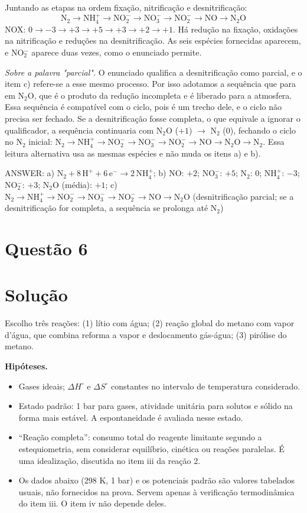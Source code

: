 \documentclass{article}%
\begin{document}
Juntando as etapas na ordem fixação, nitrificação e desnitrificação:
\[
\mathrm{N_2 \rightarrow NH_4^{+} \rightarrow NO_2^{-} \rightarrow NO_3^{-} \rightarrow NO_2^{-} \rightarrow NO \rightarrow N_2O}
\]
NOX: $0 \rightarrow -3 \rightarrow +3 \rightarrow +5 \rightarrow +3 \rightarrow +2 \rightarrow +1$. Há redução na fixação, oxidações na nitrificação e reduções na desnitrificação. As seis espécies fornecidas aparecem, e NO$_2^-$ aparece duas vezes, como o enunciado permite.

\emph{Sobre a palavra "parcial".} O enunciado qualifica a desnitrificação como parcial, e o item c) refere-se a esse mesmo processo. Por isso adotamos a sequência que para em N$_2$O, que é o produto da redução incompleta e é liberado para a atmosfera. Essa sequência é compatível com o ciclo, pois é um trecho dele, e o ciclo não precisa ser fechado. Se a desnitrificação fosse completa, o que equivale a ignorar o qualificador, a sequência continuaria com N$_2$O ($+1$) $\rightarrow$ N$_2$ ($0$), fechando o ciclo no N$_2$ inicial: $\mathrm{N_2 \rightarrow NH_4^{+} \rightarrow NO_2^{-} \rightarrow NO_3^{-} \rightarrow NO_2^{-} \rightarrow NO \rightarrow N_2O \rightarrow N_2}$. Essa leitura alternativa usa as mesmas espécies e não muda os itens a) e b).

ANSWER: a) $\mathrm{N_2 + 8\,H^{+} + 6\,e^{-} \longrightarrow 2\,NH_4^{+}}$; b) NO: $+2$; NO$_3^-$: $+5$; N$_2$: $0$; NH$_4^+$: $-3$; NO$_2^-$: $+3$; N$_2$O (média): $+1$; c) $\mathrm{N_2 \rightarrow NH_4^{+} \rightarrow NO_2^{-} \rightarrow NO_3^{-} \rightarrow NO_2^{-} \rightarrow NO \rightarrow N_2O}$ (desnitrificação parcial; se a desnitrificação for completa, a sequência se prolonga até N$_2$)%
\newpage%
\section*{Questão 6}

\section*{Solução}

Escolho três reações: (1) lítio com água; (2) reação global do metano com vapor d'água, que combina reforma a vapor e deslocamento gás-água; (3) pirólise do metano.

\textbf{Hipóteses.}
\begin{itemize}
\item Gases ideais; $\Delta H^\circ$ e $\Delta S^\circ$ constantes no intervalo de temperatura considerado.
\item Estado padrão: 1 bar para gases, atividade unitária para solutos e sólido na forma mais estável. A espontaneidade é avaliada nesse estado.
\item ``Reação completa'': consumo total do reagente limitante segundo a estequiometria, sem considerar equilíbrio, cinética ou reações paralelas. É uma idealização, discutida no item iii da reação 2.
\item Os dados abaixo (298 K, 1 bar) e os potenciais padrão são valores tabelados usuais, não fornecidos na prova. Servem apenas à verificação termodinâmica do item iii. O item iv não depende deles.
\end{itemize}
\end{document}
